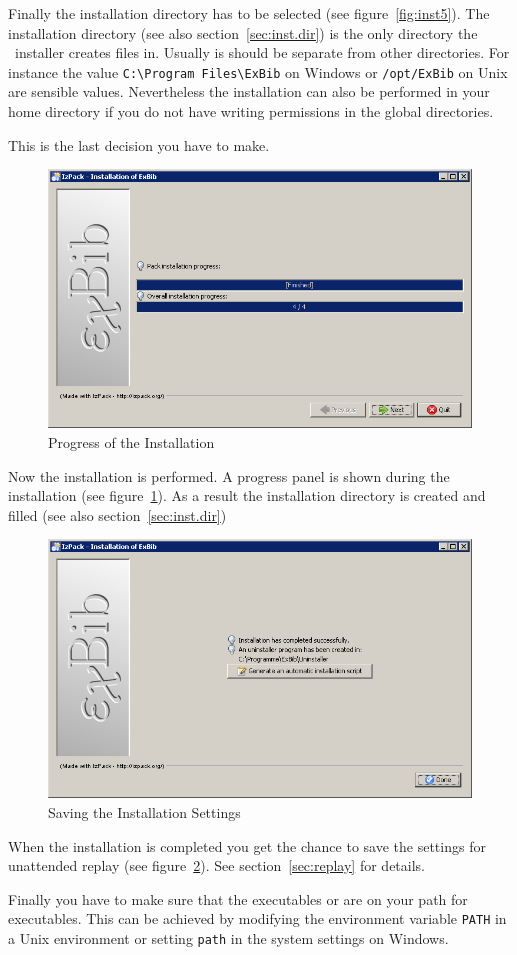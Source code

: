 Finally the installation directory has to be selected (see
figure~\ref{fig:inst5}). The installation directory (see also
section~\ref{sec:inst.dir}) is the only directory the \ExBib\ 
installer creates files in. Usually is should be separate from other
directories. For instance the value \verb|C:\Program Files\ExBib| on
Windows or \verb|/opt/ExBib| on Unix are sensible values. Nevertheless
the installation can also be performed in your home directory if you
do not have writing permissions in the global directories.

This is the last decision you have to make.

\begin{figure}[!ht]
  \centering
  \includegraphics[width=.45\textwidth]{img/inst7}
  \caption{Progress of the Installation}
  \label{fig:inst6}
\end{figure}

Now the installation is performed. A progress panel is shown during
the installation (see figure~\ref{fig:inst6}). As a result the
installation directory is created and filled (see also
section~\ref{sec:inst.dir})

\begin{figure}[!ht]
  \centering
  \includegraphics[width=.45\textwidth]{img/inst8}
  \caption{Saving the Installation Settings}
  \label{fig:inst7}
\end{figure}

When the installation is completed you get the chance to save the
settings for unattended replay (see figure~\ref{fig:inst7}). See
section~\ref{sec:replay} for details.


Finally you have to make sure that the executables  or
\Prog{exbib.bat} are on your path for executables.\index{path} This
can be achieved by modifying the environment variable \verb|PATH| in a
Unix environment or setting \verb|path| in the system settings on
Windows.


